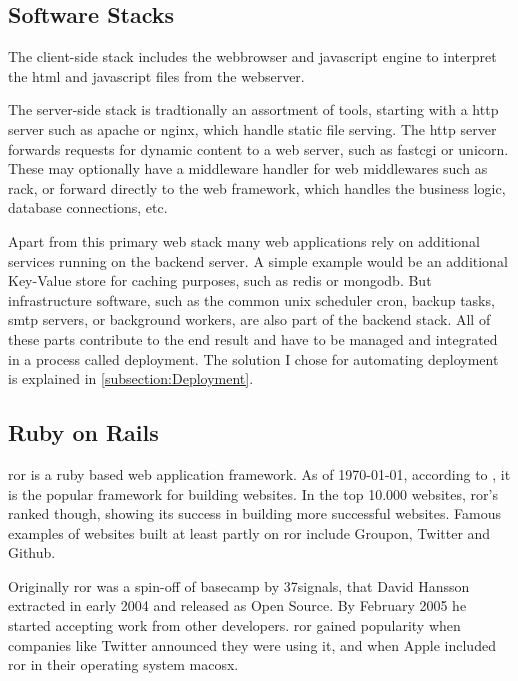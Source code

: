 \subsection{Software Stacks}

The client-side stack includes the webbrowser and \gls{javascript} engine to interpret the \gls{html} and \gls{javascript} files from the webserver.

The server-side stack is tradtionally an assortment of tools, starting with a \gls{http} server such as \gls{apache} or \gls{nginx}, which handle static file serving. The \gls{http} server forwards requests for dynamic content to a web server, such as \gls{fastcgi} or \gls{unicorn}. These may optionally have a middleware handler for web middlewares such as \gls{rack}, or forward directly to the web framework, which handles the business logic, database connections, etc.

Apart from this primary web stack many web applications rely on additional services running on the backend server. A simple example would be an additional Key-Value store for caching purposes, such as \gls{redis} or \gls{mongodb}. But infrastructure software, such as the common unix scheduler \gls{cron}, backup tasks, \gls{smtp} servers, or background workers, are also part of the backend stack. All of these parts contribute to the end result and have to be managed and integrated in a process called deployment. The solution I chose for automating deployment is explained in \autoref{subsection:Deployment}.

\subsection{Ruby on Rails}

\acrfull{ror} is a \gls{ruby} based web application framework. As of \today, according to \citet{builtwith}, it is the  popular framework for building websites. In the top 10.000 websites, \gls{ror}'s ranked  though, showing its success in building more successful websites. Famous examples of websites built at least partly on \gls{ror} include Groupon, Twitter and Github\citep{ror}.

Originally \gls{ror} was a spin-off of \gls{basecamp} by 37signals, that David Hansson extracted in early 2004 and released as Open Source.\citep{railsinterview} By February 2005 he started accepting work from other developers. \gls{ror} gained popularity when companies like Twitter announced they were using it\citep{forbestwitterror}, and when Apple included \gls{ror} in their operating system \gls{macosx}.

